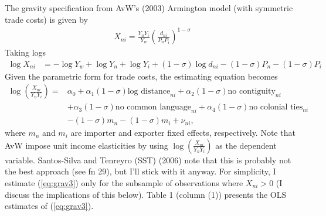 \documentclass[12pt]{article}
\begin{document}
\subsection{} The gravity specification from AvW's (2003) Armington model (with symmetric trade costs) is given by
\begin{align}
X_{ni} = \frac{Y_nY_i}{Y_w}\left(\frac{d_{ni}}{P_n P_i}\right)^{1-\sigma}  \label{eq:grav1}
\end{align}
Taking logs
\begin{align*}
\log X_{ni} &= - \log Y_w + \log Y_n + \log Y_i + (1-\sigma)\log d_{ni} - (1-\sigma)P_n - (1-\sigma)P_i 
\end{align*}
Given the parametric form for trade costs, the estimating equation becomes
\begin{align}
\log \left(\frac{X_{ni}}{Y_n Y_i}\right) =& \alpha_0 + \alpha_1 (1-\sigma) \text{log distance}_{ni} +  \alpha_2 (1-\sigma) \text{no contiguity}_{ni} \nonumber\\
&+ \alpha_3 (1-\sigma) \text{no common language}_{ni} + \alpha_4 (1-\sigma) \text{no colonial ties}_{ni} \nonumber\\
&- (1-\sigma)m_n - (1-\sigma)m_i + \nu_{ni}, \label{eq:grav3}
\end{align}
where $m_n$ and $m_i$ are importer and exporter fixed effects, respectively. Note that AvW impose unit income elasticities by using $\log \left(\frac{X_{ni}}{Y_n Y_i}\right)$ as the dependent variable. Santos-Silva and Tenreyro (SST) (2006) note that this is probably not the best approach (see fn 29), but I'll stick with it anyway. For simplicity, I estimate (\ref{eq:grav3}) only for the subsample of observations where $X_{ni} >0$ (I discuss the implications of this below). Table 1 (column (1)) presents the OLS estimates of (\ref{eq:grav3}).
\end{document}
